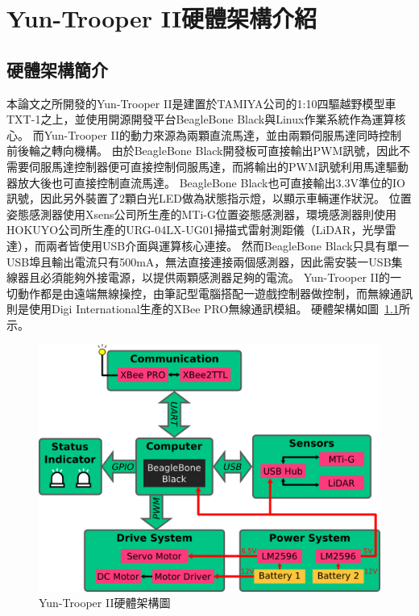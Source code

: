 \chapter{Yun-Trooper II硬體架構介紹}
\label{c:hardware}

\section{硬體架構簡介}
本論文之所開發的Yun-Trooper II是建置於TAMIYA公司的1:10四驅越野模型車TXT-1之上，並使用開源開發平台BeagleBone Black與Linux作業系統作為運算核心。
而Yun-Trooper II的動力來源為兩顆直流馬達，並由兩顆伺服馬達同時控制前後輪之轉向機構。
由於BeagleBone Black開發板可直接輸出PWM訊號，因此不需要伺服馬達控制器便可直接控制伺服馬達，而將輸出的PWM訊號利用馬達驅動器放大後也可直接控制直流馬達。
BeagleBone Black也可直接輸出3.3V準位的IO訊號，因此另外裝置了2顆白光LED做為狀態指示燈，以顯示車輛運作狀況。
位置姿態感測器使用Xsens公司所生產的MTi-G位置姿態感測器，環境感測器則使用HOKUYO公司所生產的URG-04LX-UG01掃描式雷射測距儀（LiDAR，光學雷達），而兩者皆使用USB介面與運算核心連接。
然而BeagleBone Black只具有單一USB埠且輸出電流只有500mA，無法直接連接兩個感測器，因此需安裝一USB集線器且必須能夠外接電源，以提供兩顆感測器足夠的電流。
Yun-Trooper II的一切動作都是由遠端無線操控，由筆記型電腦搭配一遊戲控制器做控制，而無線通訊則是使用Digi International生產的XBee PRO無線通訊模組。
硬體架構如圖~\ref{f:hardware_structure}所示。

\begin{figure}[h!]
	\centering
	\includegraphics[width=\textwidth]{figures/hardware/HardwareStructure}
	\caption{Yun-Trooper II硬體架構圖}
	\label{f:hardware_structure}
\end{figure}

